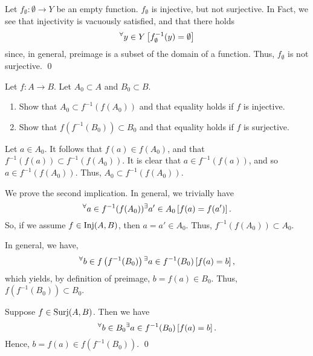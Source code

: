 \documentclass[a4paper,12pt]{article}
\begin{document}
\begin{rem}
	Let \( f_{\emptyset}:\emptyset \to Y \)
	be an empty function.
	\( f_{\emptyset} \) is injective, but not surjective.
	In Fact, we see that
	injectivity is vacuously satisfied, and that there holds
	\begin{equation*}
		{}^{\forall} y \in Y
		\left[f_{\emptyset}^{-1}(y) = \emptyset \right]
	\end{equation*}
	since, in general, preimage is a subset of the domain of a function.
	Thus, \( f_{\emptyset} \) is not surjective.
	\qed\end{rem}

\begin{exe}
	Let \( f:A\to B \).
	Let \( A_0\subset A \) and \( B_0 \subset B \).
	\begin{enumerate}
		\item
		      Show that \( A_0 \subset f ^{-1}(f(A_0)) \)
		      and that equality holds if \( f \) is injective.
		      
		\item
		      Show that \( f(f^{-1}(B_0)) \subset B_0 \)
		      and that equality holds if \( f \) is surjective.
	\end{enumerate}
\end{exe}\begin{sol}\leavevmode \par
	Let
	\(a \in A_0\).
	It follows that 
	\(f(a) \in f(A_0)\),
	and that
	\(f ^{-1} \left( f(a) \right) \subset f^{-1} \left( f(A_0)\right)\).
	It is clear that
	\(a \in f  ^{-1}\left( f(a) \right)\),
	and so
	\(a \in f  ^{-1}\left( f(A_0) \right)\).
	Thus,
	\( A_0 \subset f ^{-1}(f(A_0)) \).
	
	We prove the second implication.
	In general, we trivially have
	\begin{equation*}
		{}^{\forall} a \in f ^{-1}(f(A_0))
		{}^{\exists}a' \in A_0
		\left[ f(a) = f(a')\right].
	\end{equation*}
	So, if we assume 
	\(f \in \mathrm{Inj}(A,B)\),
	then
	\(a = a' \in A_0\).
	Thus, 
	\( f ^{-1}(f(A_0)) \subset A_0 \).
	
	In general, we have,
	\begin{equation*}
		{}^{\forall} b \in f \left( f ^{-1}(B_0) \right)
		{}^{\exists}a \in f ^{-1}(B_0)
		\left[ f(a) = b\right],
	\end{equation*}
	which yields, by definition of preimage,
	\(b = f(a) \in B_0\).
	Thus,
	\(f \left( f ^{-1}(B_0) \right) \subset B_0\).
	
	Suppose
	\( f \in \mathrm{Surj}(A,B) \).
	Then we have
	\begin{equation*}
		{}^{\forall} b \in B_0
		{}^{\exists}a \in f ^{-1}(B_0)
		\left[ f(a) = b \right].
	\end{equation*}
	Hence,
	\(b  = f(a) \in f \left( f ^{-1}(B_0) \right)\).
	\qed\end{sol}
\end{document}
